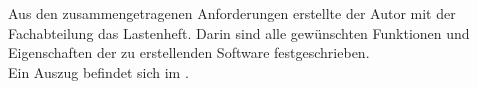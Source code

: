 Aus den zusammengetragenen Anforderungen erstellte der Autor mit der Fachabteilung das Lastenheft. 
Darin sind alle gewünschten Funktionen und Eigenschaften der zu erstellenden 
Software festgeschrieben.\\
Ein Auszug befindet sich im .
\clearpage